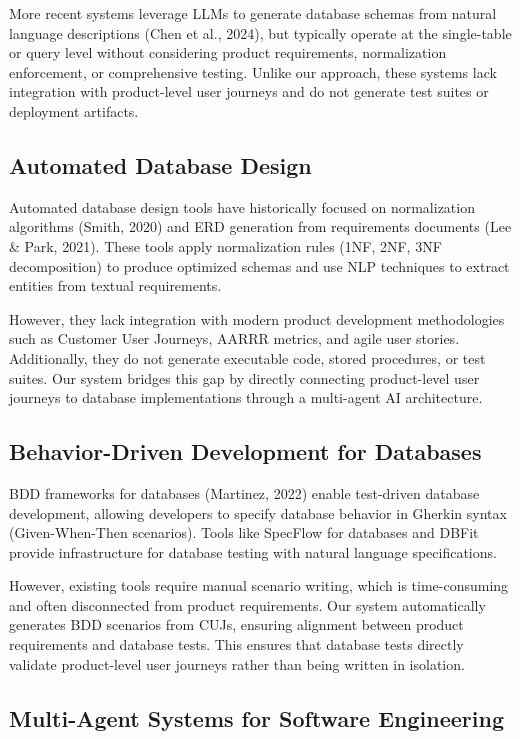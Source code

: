 \documentclass[12pt,a4paper]{article}
\begin{document}
More recent systems leverage LLMs to generate database schemas from natural language descriptions (Chen et al., 2024), but typically operate at the single-table or query level without considering product requirements, normalization enforcement, or comprehensive testing. Unlike our approach, these systems lack integration with product-level user journeys and do not generate test suites or deployment artifacts.

\subsection{Automated Database Design}

Automated database design tools have historically focused on normalization algorithms (Smith, 2020) and ERD generation from requirements documents (Lee \& Park, 2021). These tools apply normalization rules (1NF, 2NF, 3NF decomposition) to produce optimized schemas and use NLP techniques to extract entities from textual requirements.

However, they lack integration with modern product development methodologies such as Customer User Journeys, AARRR metrics, and agile user stories. Additionally, they do not generate executable code, stored procedures, or test suites. Our system bridges this gap by directly connecting product-level user journeys to database implementations through a multi-agent AI architecture.

\subsection{Behavior-Driven Development for Databases}

BDD frameworks for databases (Martinez, 2022) enable test-driven database development, allowing developers to specify database behavior in Gherkin syntax (Given-When-Then scenarios). Tools like SpecFlow for databases and DBFit provide infrastructure for database testing with natural language specifications.

However, existing tools require manual scenario writing, which is time-consuming and often disconnected from product requirements. Our system automatically generates BDD scenarios from CUJs, ensuring alignment between product requirements and database tests. This ensures that database tests directly validate product-level user journeys rather than being written in isolation.

\subsection{Multi-Agent Systems for Software Engineering}
\end{document}
